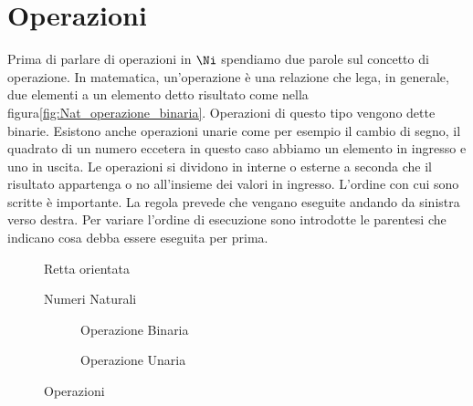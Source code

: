 \section{Operazioni}
Prima di parlare di operazioni in $\Ni$ spendiamo due parole sul concetto di operazione. In matematica, un'operazione è una relazione che lega, in generale, due elementi a un elemento detto risultato come nella figura\nobs\vref{fig:Nat_operazione_binaria}. Operazioni di questo tipo vengono dette binarie. Esistono anche operazioni unarie come per esempio il cambio di segno, il quadrato di un numero eccetera in questo caso abbiamo un elemento in ingresso e uno in uscita. Le operazioni si dividono in interne o esterne a seconda che il risultato appartenga o no all'insieme dei valori in ingresso. L'ordine con cui sono scritte è importante. La regola prevede che vengano eseguite andando da sinistra verso destra. Per variare l'ordine di esecuzione sono introdotte le parentesi che indicano cosa debba essere eseguita per prima.
\begin{figure} 
	\centering

	\caption{Retta orientata}
	\label{fig:NumeriNaturaliRetta}\end{figure}
\begin{figure} 
	\centering

	\caption{Numeri Naturali}
	\label{fig:NumeriNaturali}\end{figure}
\begin{figure}
	\begin{subfigure}[b]{.5\linewidth}
		\centering

	\caption{Operazione Binaria}
	\label{fig:Nat_operazione_binaria}
	\end{subfigure}%
	\begin{subfigure}[b]{.5\linewidth}
	\centering

	\caption{Operazione Unaria}
	\label{fig:Nat_operazione_unaria}
	\end{subfigure}
		\caption{Operazioni}
	\label{fig:OPerzionicasogen}
\end{figure}
